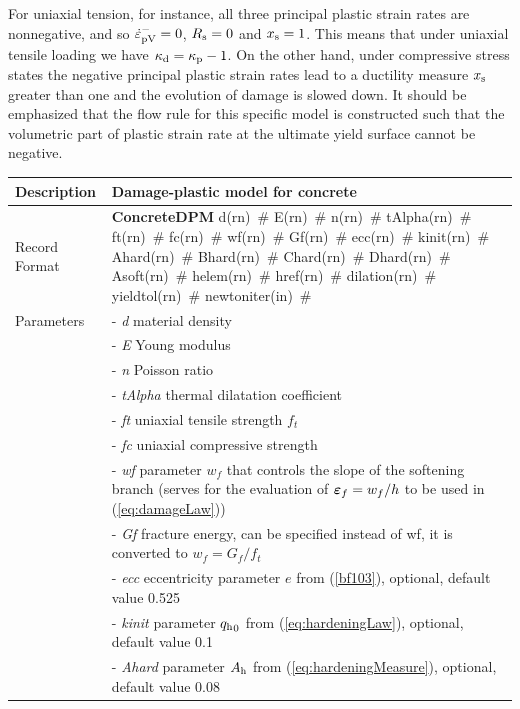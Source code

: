 \documentclass[a4paper]{article}
\newcommand{\mbf}[1]{\mbox{\boldmath$#1$}}
\newcommand{\descitem}[1]{{\noindent \bf #1}}
\newcommand{\elemparam}[2]{{{#1\tiny (#2)}~\#}}
\newcommand{\param}[1]{{\it #1}}
\newcommand{\eps} {\mbf{\varepsilon}}
\begin{document}
For uniaxial tension, for instance, all three principal plastic strain rates are nonnegative, and so $\dot{\varepsilon}_{\rm pV}^{-} =0$, $R_{\rm s}=0$ and $x_{\rm s}=1$. This means that under uniaxial tensile loading we have $\kappa_{\rm d}=\kappa_{\rm p}-1$. On the other hand, under compressive stress states the negative principal plastic strain rates lead to a ductility measure $x_{\rm s}$ greater than one and the evolution of damage is slowed down. It should be emphasized that the flow rule for this specific model is constructed such that the volumetric part of plastic strain rate at the ultimate yield surface cannot be negative.

\begin{table}[!htb]
\begin{tabular}{|l|p{9cm}|}
\hline
Description & Damage-plastic model for concrete\\
\hline
Record Format & \descitem{ConcreteDPM}  \elemparam{d}{rn}
\elemparam{E}{rn} \elemparam{n}{rn} \elemparam{tAlpha}{rn}
 \elemparam{ft}{rn} \elemparam{fc}{rn} \elemparam{wf}{rn} \elemparam{Gf}{rn} \elemparam{ecc}{rn}
 \elemparam{kinit}{rn} \elemparam{Ahard}{rn} \elemparam{Bhard}{rn} \elemparam{Chard}{rn} \elemparam{Dhard}{rn} \elemparam{Asoft}{rn} \elemparam{helem}{rn} \elemparam{href}{rn} \elemparam{dilation}{rn} \elemparam{yieldtol}{rn} \elemparam{newtoniter}{in} \\
Parameters &- \param{d} material density\\
&- \param{E} Young modulus\\
&- \param{n} Poisson ratio\\
&- \param{tAlpha} thermal dilatation coefficient\\
&- \param{ft} uniaxial tensile strength $f_t$\\
&- \param{fc} uniaxial compressive strength\\
&- \param{wf} parameter $w_f$ that controls the slope of the softening branch (serves for the evaluation of $\eps_f=w_f/h$ to be used in (\ref{eq:damageLaw}))\\
&- \param{Gf} fracture energy, can be specified instead of wf, it is converted to $w_f=G_f/f_t$ \\
&- \param{ecc} eccentricity parameter $e$ from (\ref{bf103}), optional, default value 0.525\\
&- \param{kinit} parameter ${q_{\rm h}}_0$ from (\ref{eq:hardeningLaw}), optional, default value 0.1\\
&- \param{Ahard} parameter $A_{\rm h}$ from (\ref{eq:hardeningMeasure}), optional, default value 0.08\\

\end{tabular}
\end{table}
\end{document}
